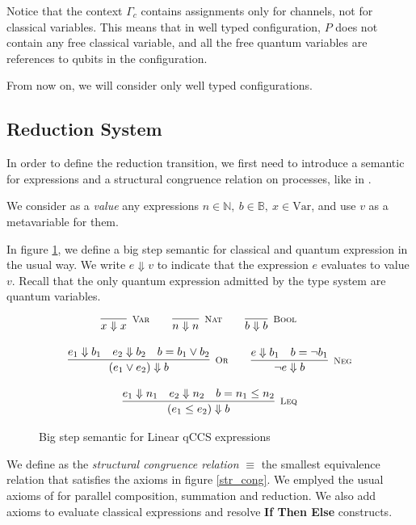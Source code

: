 Notice that the context $\Gamma_c$ contains assignments only for channels, not for classical variables. This means that in well typed configuration, $P$ does not contain any free classical variable, and all the free quantum variables are references to qubits in the configuration.

From now on, we will consider only well typed configurations.

\subsection{Reduction System}
In order to define the reduction transition, we first need to introduce a semantic for expressions and a structural congruence relation on processes, like in \cite{gayCommunicatingQuantumProcesses2005}.

We consider as a \textit{value} any expressions $n \in \mathbb{N},\  b \in \mathbb{B},\  x \in  \text{Var}$, and use $v$ as a metavariable for them.

In figure \ref{big_step_exp}, we define a big step semantic for classical and quantum expression in the usual way. We write $e \Downarrow v$ to indicate that the expression $e$ evaluates to value $v$. Recall that the only quantum expression admitted by the type system are quantum variables.

\begin{figure}[h!]
\begin{gather*}
\infer[\mbox{\footnotesize\scshape Var}]{x \Downarrow x}{} \qquad
    \infer[\mbox{\footnotesize\scshape Nat}]{n \Downarrow n}{} \qquad
    \infer[\mbox{\footnotesize\scshape Bool}]{b \Downarrow b}{}  \qquad
\\[0.3cm]
    \infer[\mbox{\footnotesize\scshape Or}]{(e_1 \lor e_2) \Downarrow b}{e_1 \Downarrow b_1 & e_2 \Downarrow b_2 & b = b_1 \lor b_2} \qquad
    \infer[\mbox{\footnotesize\scshape Neg}]{\neg e \Downarrow b}{e \Downarrow b_1 & b = \neg b_1} \\[0.3cm]
    \infer[\mbox{\footnotesize\scshape Leq}]{(e_1 \leq e_2) \Downarrow b}{e_1 \Downarrow n_1 & e_2 \Downarrow n_2 & b = n_1 \leq n_2}
\end{gather*}
\caption{Big step semantic for Linear qCCS expressions}
\label{big_step_exp}
\end{figure}

We define as the \textit{structural congruence relation} $\equiv$ the smallest equivalence relation that satisfies the axioms in figure \ref{str_cong}. We emplyed the usual axioms of \cite{milnerFunctionsProcesses1990} for parallel composition, summation and reduction. We also add axioms to evaluate classical expressions and resolve \textbf{If Then Else} constructs.

